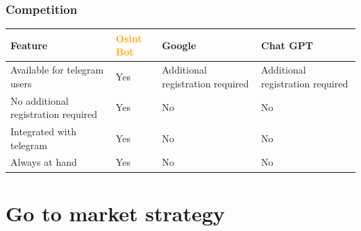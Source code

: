 \documentclass[aspectratio=169]{beamer}
\begin{document}
\begin{frame}
    \frametitle{Competition}
    
    \begin{table}[ht]
        \centering
        \begin{tabular}{|>{\raggedright\arraybackslash}m{2cm}|>{\centering\arraybackslash}m{2.5cm}|>{\centering\arraybackslash}m{2.5cm}|>{\centering\arraybackslash}m{2.5cm}|}
        \hline
        \rowcolor{white} \textbf{Feature} & \textbf{\textcolor{orange}{Osint Bot}} & \textbf{Google} & \textbf{Chat GPT} \\
        \hline
        Available for telegram users & \cellcolor{green!10} Yes & \cellcolor{red!10} Additional registration required & \cellcolor{red!10} Additional registration required \\
        \hline
        No additional registration required & \cellcolor{green!10} Yes & \cellcolor{red!10} No & \cellcolor{red!10} No \\
        \hline
        Integrated with telegram & \cellcolor{green!10} Yes & \cellcolor{red!10} No & \cellcolor{red!10} No \\
        \hline
        Always at hand & \cellcolor{green!10} Yes & \cellcolor{red!10} No & \cellcolor{red!10} No \\
        \hline
        \end{tabular}
    \end{table}
    
\end{frame}

\section{Go to market strategy}
\end{document}
